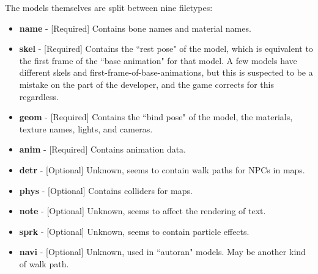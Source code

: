 \documentclass{article}
\begin{document}
The models themselves are split between nine filetypes:
\begin{itemize}
\item \textbf{name} - [Required] Contains bone names and material names.
\item \textbf{skel} - [Required] Contains the ``rest pose" of the model, which is equivalent to the first frame of the ``base animation" for that model. A few models have different skels and first-frame-of-base-animations, but this is suspected to be a mistake on the part of the developer, and the game corrects for this regardless.
\item \textbf{geom} - [Required] Contains the ``bind pose" of the model, the materials, texture names, lights, and cameras.
\item \textbf{anim} - [Required] Contains animation data. 
\item \textbf{detr} - [Optional] Unknown, seems to contain walk paths for NPCs in maps.
\item \textbf{phys} - [Optional] Contains colliders for maps.
\item \textbf{note} - [Optional] Unknown, seems to affect the rendering of text.
\item \textbf{sprk} - [Optional] Unknown, seems to contain particle effects.
\item \textbf{navi} - [Optional] Unknown, used in ``autoran" models. May be another kind of walk path.
\end{itemize}
\end{document}
